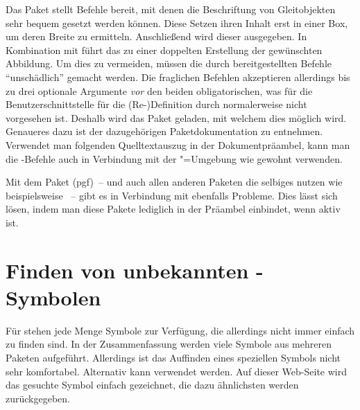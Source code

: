 Das Paket  stellt Befehle bereit, mit denen die Beschriftung 
von Gleitobjekten sehr bequem gesetzt werden können. Diese Setzen ihren Inhalt 
erst in einer Box, um deren Breite zu ermitteln. Anschließend wird dieser 
ausgegeben. In Kombination mit  führt das zu einer 
doppelten Erstellung der gewünschten Abbildung. Um dies zu vermeiden, müssen 
die durch  bereitgestellten Befehle \enquote{unschädlich} 
gemacht werden. Die fraglichen Befehlen akzeptieren allerdings bis zu drei 
optionale Argumente \emph{vor} den beiden obligatorischen, was für die 
Benutzerschnittstelle für die (Re-)Definition durch  
normalerweise nicht vorgesehen ist. Deshalb wird das Paket  
geladen, mit welchem dies möglich wird. Genaueres dazu ist der dazugehörigen 
Paketdokumentation zu entnehmen. Verwendet man folgenden Quelltextauszug in der 
Dokumentpräambel, kann man die -Befehle auch in Verbindung 
mit der "=Umgebung wie gewohnt verwenden.
%
\begin{quoting}
\begin{Code}
\usepackage{floatrow}
\usepackage{xparse}
\ifpdf\else
\fi
\end{Code}
\end{quoting}

Mit dem Paket (pgf)~-- und auch allen anderen Paketen die 
selbiges nutzen wie beispielsweise ~-- gibt es in Verbindung 
mit  ebenfalls Probleme. Dies lässt sich lösen, indem man 
diese Pakete lediglich in der Präambel einbindet, wenn  aktiv 
ist.
%
\begin{quoting}[rightmargin=0pt]
\begin{Code}
\ifpdf
  \usepackage{tikz}%
\fi
\end{Code}
\end{quoting}



\section{Finden von unbekannten -Symbolen}
Für  stehen jede Menge Symbole zur Verfügung, die allerdings 
nicht immer einfach zu finden sind. In der Zusammenfassung
%
{} werden viele Symbole aus mehreren Paketen aufgeführt. 
Allerdings ist das Auffinden eines speziellen Symbols nicht sehr komfortabel. 
Alternativ kann  
verwendet werden. Auf dieser Web-Seite wird das gesuchte Symbol einfach 
gezeichnet, die dazu ähnlichsten werden zurückgegeben.
